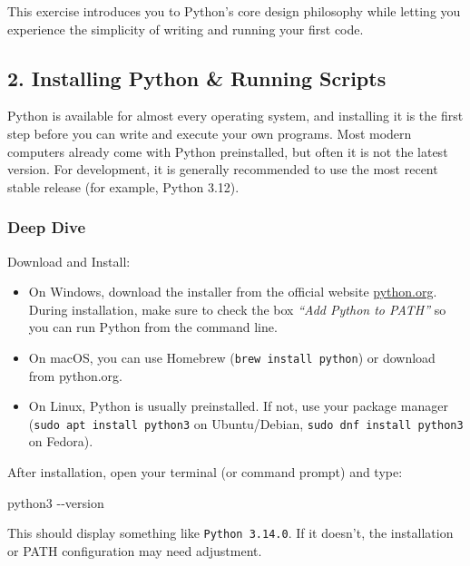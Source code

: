 \documentclass[
  letterpaper,
  DIV=11,
  numbers=noendperiod]{scrreprt}
\newenvironment{Shaded}{\begin{snugshade}}{\end{snugshade}}
\newcommand{\AttributeTok}[1]{\textcolor[rgb]{0.40,0.45,0.13}{#1}}
\newcommand{\ExtensionTok}[1]{\textcolor[rgb]{0.00,0.23,0.31}{#1}}
\providecommand{\tightlist}{%
  \setlength{\itemsep}{0pt}\setlength{\parskip}{0pt}}
\begin{document}
This exercise introduces you to Python's core design philosophy while
letting you experience the simplicity of writing and running your first
code.

\subsection{2. Installing Python \& Running
Scripts}\label{installing-python-running-scripts}

Python is available for almost every operating system, and installing it
is the first step before you can write and execute your own programs.
Most modern computers already come with Python preinstalled, but often
it is not the latest version. For development, it is generally
recommended to use the most recent stable release (for example, Python
3.12).

\subsubsection{Deep Dive}\label{deep-dive-1}

Download and Install:

\begin{itemize}
\tightlist
\item
  On Windows, download the installer from the official website
  \href{https://www.python.org}{python.org}. During installation, make
  sure to check the box \emph{``Add Python to PATH''} so you can run
  Python from the command line.
\item
  On macOS, you can use Homebrew (\texttt{brew\ install\ python}) or
  download from python.org.
\item
  On Linux, Python is usually preinstalled. If not, use your package
  manager (\texttt{sudo\ apt\ install\ python3} on Ubuntu/Debian,
  \texttt{sudo\ dnf\ install\ python3} on Fedora).
\end{itemize}

After installation, open your terminal (or command prompt) and type:

\begin{Shaded}
\begin{Highlighting}[]
\ExtensionTok{python3} \AttributeTok{{-}{-}version}
\end{Highlighting}
\end{Shaded}

This should display something like \texttt{Python\ 3.14.0}. If it
doesn't, the installation or PATH configuration may need adjustment.
\end{document}

